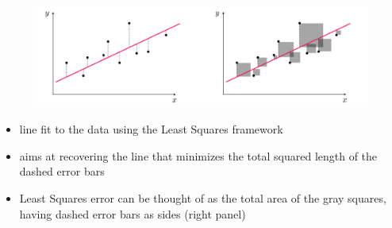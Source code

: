 \documentclass[english,14pt]{beamer}
\begin{document}

\begin{frame}[fragile]

\frametitle{}


\begin{figure}[ht]
	\centering
	\includegraphics[width=\textwidth]{figures/Least_Squares}
\end{figure}

\begin{itemize}
	\item line fit to the data using the Least Squares framework
	\item aims at recovering the line that minimizes the total squared length of the dashed error bars
	\item Least Squares error can be thought of as the total area of the gray squares, having dashed error bars as sides (right panel) 
\end{itemize}

\end{frame}

%
%
%
%
%
%

\end{document}

